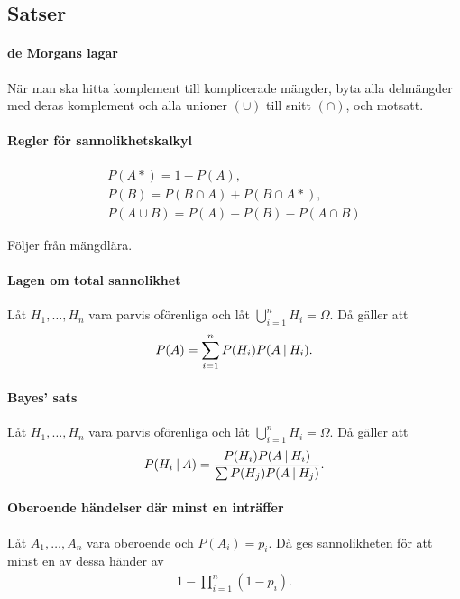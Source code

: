 \subsection{Satser}

\paragraph{de Morgans lagar}
När man ska hitta komplement till komplicerade mängder, byta alla delmängder med deras komplement och alla unioner $(\cup)$ till snitt $(\cap)$, och motsatt.

\paragraph{Regler för sannolikhetskalkyl}
\begin{align*}
	P(A*) = 1 - P(A), \\
	P(B) = P(B\cap A) + P(B\cap A*), \\
	P(A\cup B) = P(A) + P(B) - P(A\cap B)
\end{align*}

\proof
Följer från mängdlära.

\paragraph{Lagen om total sannolikhet}
Låt $H_1, \dots, H_n$ vara parvis oförenliga och låt $\bigcup\limits_{i = 1}^{n}H_i = \Omega$. Då gäller att
\begin{align*}
	P(A) = \sum\limits_{i = 1}^{n}P(H_i)P(A\:\vert\: H_i).
\end{align*}

\proof

\paragraph{Bayes' sats}
Låt $H_1, \dots, H_n$ vara parvis oförenliga och låt $\bigcup\limits_{i = 1}^{n}H_i = \Omega$. Då gäller att
\begin{align*}
	P(H_i\:\vert\: A) = \frac{P(H_i)P(A\:\vert\: H_i)}{\sum P(H_j)P(A\:\vert\: H_j)}.
\end{align*}

\proof

\paragraph{Oberoende händelser där minst en inträffer}
Låt $A_1, \dots, A_n$ vara oberoende och $P(A_i) = p_i$. Då ges sannolikheten för att minst en av dessa händer av
\begin{align*}
	1 - \prod\limits_{i = 1}^{n}(1 - p_i).
\end{align*}

\proof